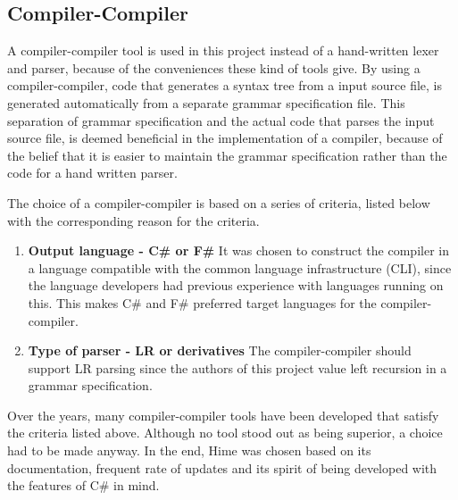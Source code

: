 \subsection{Compiler-Compiler}
\label{sec:compiler_compiler_choice}

A compiler-compiler tool is used in this project instead of a hand-written lexer and parser, because of the conveniences these kind of tools give. By using a compiler-compiler, code that generates a syntax tree from a input source file, is generated automatically from a separate grammar specification file. This separation of grammar specification and the actual code that parses the input source file, is deemed beneficial in the implementation of a compiler, because of the belief that it is easier to maintain the grammar specification rather than the code for a hand written parser.



The choice of a compiler-compiler is based on a series of criteria, listed below with the corresponding reason for the criteria.

\begin{enumerate}
\item \textbf{Output language - C\# or F\#} It was chosen to construct the compiler in a language compatible with the common language infrastructure (CLI), since the language developers had previous experience with languages running on this. This makes C\# and F\# preferred target languages for the compiler-compiler.

\item \textbf{Type of parser - LR or derivatives} The compiler-compiler should support LR parsing since the authors of this project value left recursion in a grammar specification.\\ 

\end{enumerate}

Over the years, many compiler-compiler tools have been developed that satisfy the criteria listed above. Although no tool stood out as being superior, a choice had to be made anyway. In the end, Hime was chosen based on its documentation, frequent rate of updates and its spirit of being developed with the features of C\# in mind.

